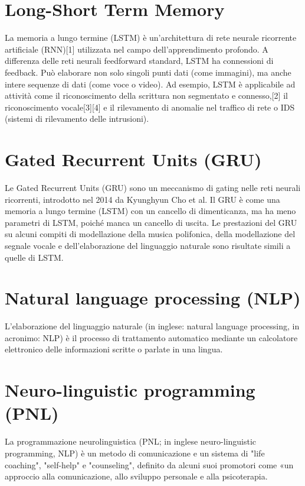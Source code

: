 \documentclass[12pt,a4paper]{report}
\begin{document}
\begin{appendices}
\section{Long-Short Term Memory}
\label{appendix:LSTM}
La memoria a lungo termine (LSTM) è un'architettura di rete neurale ricorrente artificiale (RNN)[1] utilizzata nel campo dell'apprendimento profondo. A differenza delle reti neurali feedforward standard, LSTM ha connessioni di feedback. Può elaborare non solo singoli punti dati (come immagini), ma anche intere sequenze di dati (come voce o video). Ad esempio, LSTM è applicabile ad attività come il riconoscimento della scrittura non segmentato e connesso,[2] il riconoscimento vocale[3][4] e il rilevamento di anomalie nel traffico di rete o IDS (sistemi di rilevamento delle intrusioni).

\section{Gated Recurrent Units (GRU)}
\label{appendix:GRU}
Le Gated Recurrent Units (GRU) sono un meccanismo di gating nelle reti neurali ricorrenti, introdotto nel 2014 da Kyunghyun Cho et al. Il GRU è come una memoria a lungo termine (LSTM) con un cancello di dimenticanza, ma ha meno parametri di LSTM, poiché manca un cancello di uscita. Le prestazioni del GRU su alcuni compiti di modellazione della musica polifonica, della modellazione del segnale vocale e dell'elaborazione del linguaggio naturale sono risultate simili a quelle di LSTM.

\section{Natural language processing (NLP)}
\label{appendix:NLP}
L'elaborazione del linguaggio naturale (in inglese: natural language processing, in acronimo: NLP) è il processo di trattamento automatico mediante un calcolatore elettronico delle informazioni scritte o parlate in una lingua.

\section{Neuro-linguistic programming (PNL)}
\label{appendix:PNL}
La programmazione neurolinguistica (PNL; in inglese neuro-linguistic programming, NLP) è un metodo di comunicazione e un sistema di "life coaching", "self-help" e "counseling", definito da alcuni suoi promotori come «un approccio alla comunicazione, allo sviluppo personale e alla psicoterapia.


\end{appendices}
\end{document}
